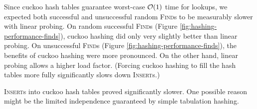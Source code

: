 Since cuckoo hash tables guarantee worst-case $\mathcal{O}(1)$ time for lookups,
we expected both successful and unsuccessful random \textsc{Find}s to be
measurably slower with linear probing.
On random successful \textsc{Find}s (Figure \ref{fig:hashing-performance-finds}),
cuckoo hashing did only very slightly better than linear probing.
On unsuccessful \textsc{Find}s (Figure \ref{fig:hashing-performance-finds}),
the benefits of cuckoo hashing were more pronounced.
On the other hand, linear probing allows a higher load factor.
(Forcing cuckoo hashing to fill the hash tables more fully significantly
slows down \textsc{Insert}s.)

\textsc{Insert}s into cuckoo hash tables proved significantly slower.
One possible reason might be the limited independence guaranteed by simple
tabulation hashing.

